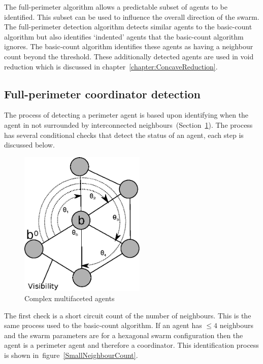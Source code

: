 The full-perimeter algorithm allows a predictable subset of agents to be identified. This subset can be used to influence the overall direction of the swarm. The full-perimeter detection algorithm detects similar agents to the basic-count algorithm but also identifies `indented' agents that the basic-count algorithm ignores. The basic-count algorithm identifies these agents as having a neighbour count beyond the threshold. These additionally detected agents are used in void reduction which is discussed in chapter~\ref{chapter:ConcaveReduction}.

\subsection{Full-perimeter coordinator detection}\label{sec:PerimeterAgentDetection} 
The process of detecting a perimeter agent is based upon identifying when the agent in not surrounded by interconnected neighbours~(Section~\ref{reduced:Perimeter1}). The process has several conditional checks that detect the status of an agent, each step is discussed below. 

\begin{figure}[H]
\begin{center}
\includegraphics[width=6cm]{CHAPTER-6/figures/Perimeter1}
\end{center}
\caption{Complex multifaceted agents \label{reduced:Perimeter1}}
\end{figure}

The first check is a short circuit count of the number of neighbours. This is the same process used to the basic-count algorithm. If an agent has $\leq 4$ neighbours and the swarm parameters are for a hexagonal swarm configuration then the agent is a perimeter agent and therefore a coordinator. This identification process is shown in~figure~\ref{SmallNeighbourCount}. 

